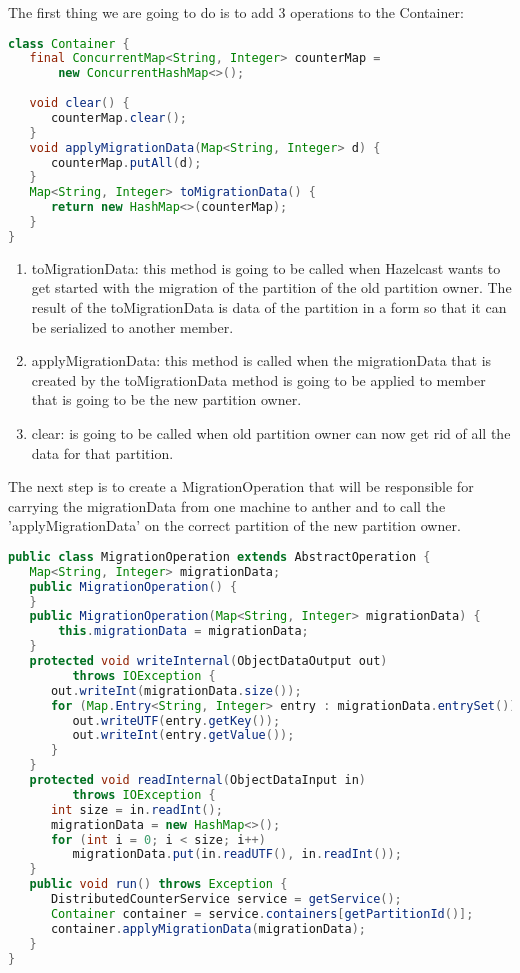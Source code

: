 The first thing we are going to do is to add 3 operations to the Container:
\begin{lstlisting}[language=java]
class Container {
   final ConcurrentMap<String, Integer> counterMap = 
       new ConcurrentHashMap<>();
   
   void clear() {
      counterMap.clear();
   }
   void applyMigrationData(Map<String, Integer> d) {
      counterMap.putAll(d);
   }
   Map<String, Integer> toMigrationData() {
      return new HashMap<>(counterMap);
   }
}
\end{lstlisting}
\begin{enumerate}
\item toMigrationData: this method is going to be called when Hazelcast wants to get started with the migration of the partition of the old partition owner. The result of the toMigrationData is data of the partition in a form so that it can be serialized to another member.
\item applyMigrationData: this method is called when the migrationData that is created by the toMigrationData method is going to be applied to member that is going to be the new partition owner.
\item clear: is going to be called when old partition owner can now get rid of all the data for that partition. 
\end{enumerate}

The next step is to create a MigrationOperation that will be responsible for carrying the migrationData from one machine to anther and to call the 'applyMigrationData' on the correct partition of the new partition owner.
\begin{lstlisting}[language=java]
public class MigrationOperation extends AbstractOperation {
   Map<String, Integer> migrationData;
   public MigrationOperation() {
   }
   public MigrationOperation(Map<String, Integer> migrationData) {
       this.migrationData = migrationData;
   }
   protected void writeInternal(ObjectDataOutput out) 
         throws IOException {
      out.writeInt(migrationData.size());
      for (Map.Entry<String, Integer> entry : migrationData.entrySet()) {
         out.writeUTF(entry.getKey());
         out.writeInt(entry.getValue());
      }
   }
   protected void readInternal(ObjectDataInput in) 
         throws IOException {
      int size = in.readInt();
      migrationData = new HashMap<>();
      for (int i = 0; i < size; i++)
         migrationData.put(in.readUTF(), in.readInt());
   }
   public void run() throws Exception {
      DistributedCounterService service = getService();
      Container container = service.containers[getPartitionId()];
      container.applyMigrationData(migrationData);
   }
}
\end{lstlisting}

